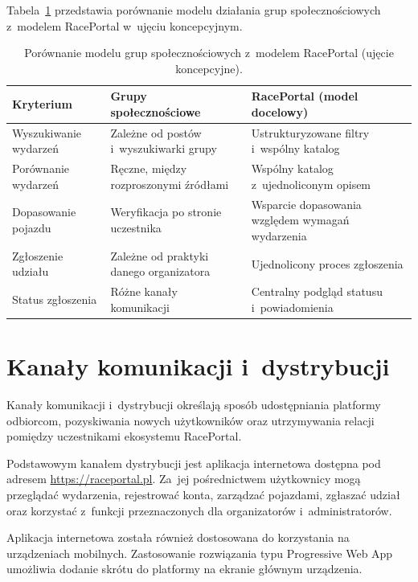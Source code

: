 \documentclass{sprz}
\begin{document}
Tabela~\ref{tab:porownanie-modeli} przedstawia porównanie modelu działania grup społecznościowych z~modelem RacePortal w~ujęciu koncepcyjnym.

\begin{table}[ht]
  \centering
  \caption{Porównanie modelu grup społecznościowych z~modelem RacePortal (ujęcie koncepcyjne).}
  \label{tab:porownanie-modeli}
  \begin{tabularx}{\textwidth}{|p{}|X|X|}
    \hline
    \textbf{Kryterium} & \textbf{Grupy społecznościowe} & \textbf{RacePortal (model docelowy)} \\
    \hline
    Wyszukiwanie wydarzeń & Zależne od postów i~wyszukiwarki grupy & Ustrukturyzowane filtry i~wspólny katalog \\
    \hline
    Porównanie wydarzeń & Ręczne, między rozproszonymi źródłami & Wspólny katalog z~ujednoliconym opisem \\
    \hline
    Dopasowanie pojazdu & Weryfikacja po stronie uczestnika & Wsparcie dopasowania względem wymagań wydarzenia \\
    \hline
    Zgłoszenie udziału & Zależne od praktyki danego organizatora & Ujednolicony proces zgłoszenia \\
    \hline
    Status zgłoszenia & Różne kanały komunikacji & Centralny podgląd statusu i~powiadomienia \\
    \hline
  \end{tabularx}
\end{table}

\section{Kanały komunikacji i~dystrybucji}
Kanały komunikacji i~dystrybucji określają sposób udostępniania platformy odbiorcom, pozyskiwania nowych użytkowników oraz utrzymywania relacji pomiędzy uczestnikami ekosystemu RacePortal.

Podstawowym kanałem dystrybucji jest aplikacja internetowa dostępna pod adresem \url{https://raceportal.pl}. Za~jej pośrednictwem użytkownicy mogą przeglądać wydarzenia, rejestrować konta, zarządzać pojazdami, zgłaszać udział oraz korzystać z~funkcji przeznaczonych dla organizatorów i~administratorów.

Aplikacja internetowa została również dostosowana do korzystania na urządzeniach mobilnych. Zastosowanie rozwiązania typu Progressive Web App umożliwia dodanie skrótu do platformy na ekranie głównym urządzenia.
\end{document}
